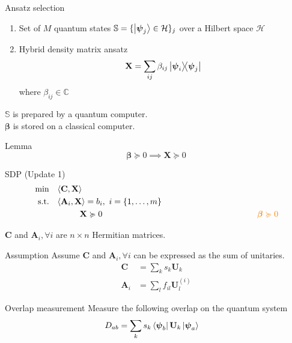 \documentclass{beamer}
\newcommand{\betamat}{\boldsymbol\beta}
\newcommand{\psivec}{\boldsymbol\psi}
\newcommand{\Amat}{\mathbf{A}}
\newcommand{\Cmat}{\mathbf{C}}
\newcommand{\Umat}{\mathbf{U}}
\newcommand{\Xmat}{\mathbf{X}}
\newcommand{\Cspace}{\mathbb{C}}
\newcommand{\Sset}{\mathbb{S}}
\newcommand{\Hilbert}{\mathcal{H}}
\newcommand{\st}{\mathrm{s.t.}}
\begin{document}
	\begin{frame}{Ansatz selection}
		\begin{enumerate}
			\item Set of $M$ quantum states $\Sset = \{\ket{\psivec_j} \in \Hilbert\}_j$ over a Hilbert space $\Hilbert$
			\item Hybrid density matrix ansatz
					$$
						\Xmat = \sum_{ij} \beta_{ij} \dyad{\psivec_i}{\psivec_j}
					$$
					where $\beta_{ij} \in \Cspace$
		\end{enumerate}
		\vfill
		$\Sset$ is prepared by a quantum computer. \\
		$\betamat$ is stored on a classical computer.
		\begin{block}{Lemma}
			$$
				\betamat \succcurlyeq 0 \implies \Xmat \succcurlyeq 0
			$$
		\end{block}
	\end{frame}
	
	\begin{frame}{SDP (Update 1)}
		\begin{equation}
			\begin{aligned}
				& \min \quad \langle \Cmat, \Xmat \rangle \nonumber \\
				& \hspace{5pt} \st \quad \langle \Amat_i, \Xmat \rangle = b_i,\ i = \{1, \dots, m\} \nonumber \\
				& \hspace{55pt} \Xmat \succcurlyeq 0 \hspace{185pt} \textcolor{orange}{\betamat \succcurlyeq 0} \nonumber
			\end{aligned}
		\end{equation}
		\vfill
		\begin{center}
			$\Cmat$ and $\Amat_i, \forall i$ are $n \times n$ Hermitian matrices.
		\end{center}
	\end{frame}

	\begin{frame}{Assumption}
		Assume $\Cmat$ and $\Amat_i, \forall i$ can be expressed as the sum of unitaries.
		\begin{align*}
			\Cmat &= \sum_k s_k \Umat_k \\
			\Amat_i &= \sum_l f_{il} \Umat_l^{(i)}
		\end{align*}
	\end{frame}
	
	\begin{frame}{Overlap measurement}
		Measure the following overlap on the quantum system
		\begin{align*}
			D_{ab} &= \sum_k s_k \bra{\psivec_b} \Umat_k \ket{\psivec_a}
		\end{align*}
	\end{frame}
\end{document}
